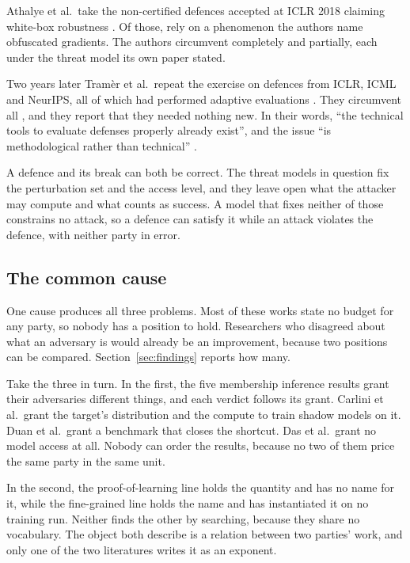 Athalye et al.\ take the \OGpopulation{} non-certified defences accepted at
ICLR 2018 claiming white-box robustness \cite{ACW18}. Of those,
\OGobfuscated{} rely on a phenomenon the authors name obfuscated gradients.
The authors circumvent \OGbrokenFull{} completely and \OGbrokenPart{}
partially, each under the threat model its own paper stated.

Two years later Tram\`er et al.\ repeat the exercise on \AAdefences{} defences
from ICLR, ICML and NeurIPS, all of which had performed adaptive evaluations
\cite{TCBM20}. They circumvent all \AAdefences{}, and they report that they
needed nothing new. In their words, ``the technical tools to evaluate defenses
properly already exist'', and the issue ``is methodological rather than
technical'' \cite{TCBM20}.

A defence and its break can both be correct. The threat models in question fix
the perturbation set and the access level, and they leave open what the
attacker may compute and what counts as success. A model that fixes neither of
those constrains no attack, so a defence can satisfy it while an attack
violates the defence, with neither party in error.

\subsection{The common cause}
\label{sec:problem-cause}

One cause produces all three problems. Most of these works state no budget for
any party, so nobody has a position to hold. Researchers who disagreed about
what an adversary is would already be an improvement, because two positions
can be compared. Section~\ref{sec:findings} reports how many.

Take the three in turn. In the first, the five membership inference results
grant their adversaries different things, and each verdict follows its grant.
Carlini et al.\ grant the target's distribution and the compute to train
shadow models on it. Duan et al.\ grant a benchmark that closes the shortcut.
Das et al.\ grant no model access at all. Nobody can order the results,
because no two of them price the same party in the same unit.

In the second, the proof-of-learning line holds the quantity and has no name
for it, while the fine-grained line holds the name and has instantiated it on
no training run. Neither finds the other by searching, because they share no
vocabulary. The object both describe is a relation between two parties' work,
and only one of the two literatures writes it as an exponent.

